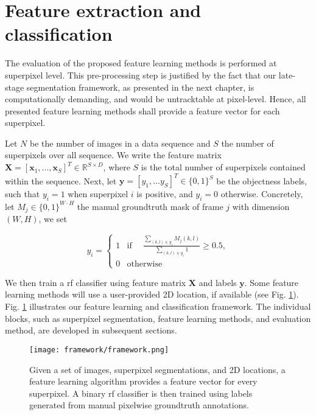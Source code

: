 \section{Feature extraction and classification} \label{framework}
The evaluation of the proposed feature learning methods is performed at superpixel level.
This pre-processing step is justified by the fact that our late-stage segmentation
framework, as presented in the next chapter, is computationally demanding, and would be untracktable at pixel-level.
Hence, all presented feature learning methods shall provide a feature vector for each superpixel.

Let $N$ be the number of images in a data sequence and $S$ the number of superpixels over all sequence.
We write the feature matrix $\boldsymbol{X} = [\boldsymbol{x}_1,...,\boldsymbol{x}_S]^T \in \mathbb{R}^{S \times D}$, where $S$ is the total number of superpixels contained within the sequence.
Next, let $\boldsymbol{y} = [y_1,...y_S]^T \in \{0,1\}^S$ be the objectness labels, such that $y_i=1$ when superpixel $i$ is positive, and $y_i=0$ otherwise.
Concretely, let $M_{j} \in \{0,1\}^{W \cdot H}$ the manual groundtruth mask of frame $j$ with dimension $(W,H)$, we set

\begin{equation}
y_{i} =
\begin{cases}
      1 & \text{if $\quad \frac{\sum_{(k,l) \in y_{i}} M_{j}(k,l)}{\sum_{(k,l) \in y_{i}}1} \geq 0.5$}, \\
      0 & \text{otherwise}
   \end{cases}
\end{equation}

We then train a \gls{rf} classifier using feature matrix $\boldsymbol{X}$ and labels $\boldsymbol{y}$.
Some feature learning methods will use a user-provided 2D location, if available (see Fig. \ref{fig:Framework}).
Fig. \ref{fig:Framework} illustrates our feature learning and classification framework.
The individual blocks, such as superpixel segmentation, feature learning methods, and evaluation method, are developed in subsequent sections.

\begin{figure}[!htpb]
  \centering
  \texttt{[image: framework/framework.png]}
  \caption[Framework description]{Given a set of images, superpixel segmentations, and 2D locations, a feature learning algorithm provides a feature vector for every superpixel.
    A binary \gls{rf} classifier is then trained using labels generated from manual pixelwise groundtruth annotations.}
  \label{fig:Framework}
\end{figure}

